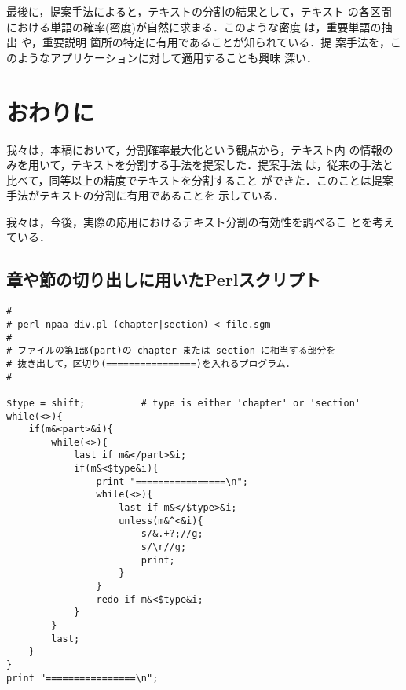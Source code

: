 最後に，提案手法によると，テキストの分割の結果として，テキスト
の各区間における単語の確率(密度)が自然に求まる．このような密度
は，重要単語の抽出
\cite{bookstein95:_detec_conten_words_serial_clust}や，重要説明
箇所の特定\cite{kurohashi97}に有用であることが知られている．提
案手法を，このようなアプリケーションに対して適用することも興味
深い．

\section{おわりに}
\label{sec:conclusion}

我々は，本稿において，分割確率最大化という観点から，テキスト内
の情報のみを用いて，テキストを分割する手法を提案した．提案手法
は，従来の手法と比べて，同等以上の精度でテキストを分割すること
ができた．このことは提案手法がテキストの分割に有用であることを
示している．

我々は，今後，実際の応用におけるテキスト分割の有効性を調べるこ
とを考えている．

\appendix

\subsection*{章や節の切り出しに用いたPerlスクリプト}

\footnotesize

\begin{verbatim}
#
# perl npaa-div.pl (chapter|section) < file.sgm
#
# ファイルの第1部(part)の chapter または section に相当する部分を
# 抜き出して，区切り(================)を入れるプログラム．
#

$type = shift;          # type is either 'chapter' or 'section'
while(<>){
    if(m&<part>&i){
        while(<>){
            last if m&</part>&i;
            if(m&<$type&i){
                print "================\n";
                while(<>){
                    last if m&</$type>&i;
                    unless(m&^<&i){
                        s/&.+?;//g;
                        s/\r//g;
                        print;
                    }
                }
                redo if m&<$type&i;
            }
        }
        last;
    }
}
print "================\n";

\end{verbatim}

\normalsize



